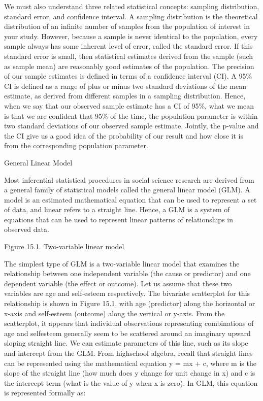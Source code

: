 We must also understand three related statistical concepts: sampling distribution, standard error, and confidence interval. A sampling distribution is the theoretical distribution of an infinite number of samples from the population of interest in your study. However, because a sample is never identical to the population, every sample always has some inherent level of error, called the standard error. If this standard error is small, then statistical estimates derived from the sample (such as sample mean) are reasonably good estimates of the population. The precision of our sample estimates is defined in terms of a confidence interval (CI). A 95\% CI is defined as a range of plus or minus two standard deviations of the mean estimate, as derived from different samples in a sampling distribution. Hence, when we say that our observed sample estimate has a CI of 95\%, what we mean is that we are confident that 95\% of the time, the population parameter is within two standard deviations of our observed sample estimate. Jointly, the p-value and the CI give us a good idea of the probability of our result and how close it is from the corresponding population parameter.

General Linear Model

Most inferential statistical procedures in social science research are derived from a general family of statistical models called the general linear model (GLM). A model is an estimated mathematical equation that can be used to represent a set of data, and linear refers to a straight line. Hence, a GLM is a system of equations that can be used to represent linear patterns of relationships in observed data.

Figure 15.1. Two-variable linear model

The simplest type of GLM is a two-variable linear model that examines the relationship between one independent variable (the cause or predictor) and one dependent variable (the effect or outcome). Let us assume that these two variables are age and self-esteem respectively. The bivariate scatterplot for this relationship is shown in Figure 15.1, with age (predictor) along the horizontal or x-axis and self-esteem (outcome) along the vertical or y-axis. From the scatterplot, it appears that individual observations representing combinations of age and selfesteem generally seem to be scattered around an imaginary upward sloping straight line. We can estimate parameters of this line, such as its slope and intercept from the GLM. From highschool algebra, recall that straight lines can be represented using the mathematical equation y = mx + c, where m is the slope of the straight line (how much does y change for unit change in x) and c is the intercept term (what is the value of y when x is zero). In GLM, this equation is represented formally as:

